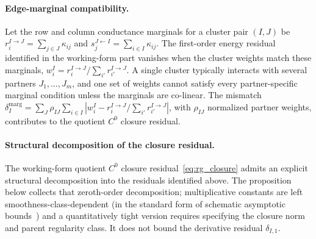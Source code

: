 \documentclass[11pt]{article}
\begin{document}
\paragraph{Edge-marginal compatibility.}
Let the row and column conductance marginals for a cluster pair $(I, J)$ be $r_i^{I \to J} = \sum_{j \in J}\kappa_{ij}$ and $s_j^{J \leftarrow I} = \sum_{i \in I}\kappa_{ij}$. The first-order energy residual identified in the working-form part vanishes when the cluster weights match these marginals, $w_i^I = r_i^{I \to J}/\sum_{i'}r_{i'}^{I \to J}$. A single cluster typically interacts with several partners $J_1, \ldots, J_m$, and one set of weights cannot satisfy every partner-specific marginal condition unless the marginals are co-linear. The mismatch $\delta_I^{\mathrm{marg}} = \sum_J \rho_{IJ}\sum_{i \in I}|w_i^I - r_i^{I \to J}/\sum_{i'}r_{i'}^{I \to J}|$, with $\rho_{IJ}$ normalized partner weights, contributes to the quotient $C^0$ closure residual.

\paragraph{Structural decomposition of the closure residual.}
The working-form quotient $C^0$ closure residual~\eqref{eq:rg_closure} admits an explicit structural decomposition into the residuals identified above. The proposition below collects that zeroth-order decomposition; multiplicative constants are left smoothness-class-dependent (in the standard form of schematic asymptotic bounds~\cite{wong2001asymptotic}) and a quantitatively tight version requires specifying the closure norm and parent regularity class. It does not bound the derivative residual $\delta_{I,1}$.
\end{document}
